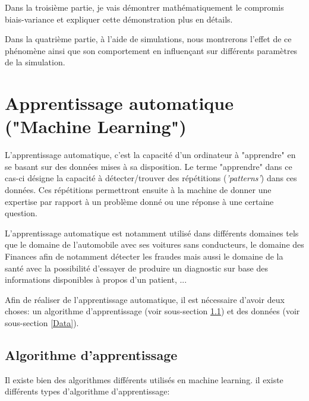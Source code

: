 \documentclass[a4paper]{article}
\begin{document}
Dans la troisième partie, je vais démontrer mathématiquement le compromis biais-variance et expliquer cette démonstration plus en détails. \newline

Dans la quatrième partie, à l'aide de simulations, nous montrerons l'effet de ce phénomène ainsi que son comportement en influençant sur différents paramètres de la simulation.\newline

\newpage

\section{Apprentissage automatique ("Machine Learning")}

L'apprentissage automatique, c'est la capacité d'un ordinateur à "apprendre" en se basant sur des données mises à sa disposition. Le terme "apprendre" dans ce cas-ci désigne la capacité à détecter/trouver des répétitions (\textit{'patterns'}) dans ces données. Ces répétitions permettront ensuite à la machine de donner une expertise par rapport à un problème donné ou une réponse à une certaine question. \cite{UnderstandingML}\cite{MLPracticalApproach} \newline 

L'apprentissage automatique est notamment utilisé dans différents domaines tels que le domaine de l'automobile avec ses voitures sans conducteurs, le domaine des Finances afin de notamment détecter les fraudes mais aussi le domaine de la santé avec la possibilité d'essayer de produire un diagnostic sur base des informations disponibles à propos d'un patient, ... \newline

Afin de réaliser de l'apprentissage automatique, il est nécessaire d'avoir deux choses: un algorithme d'apprentissage (voir sous-section \ref{LearningAlgo}) et des données (voir sous-section \ref{Data}).

\newpage

\subsection{Algorithme d'apprentissage}
\label{LearningAlgo}
Il existe bien des algorithmes différents utilisés en machine learning. il existe différents types d'algorithme d'apprentissage:
\end{document}
